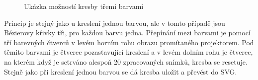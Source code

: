 \documentclass[twoside,12pt]{article}
\begin{document}
\begin{figure}[ht]
 \begin{center}
 \end{center}
 \caption{Ukázka možností kresby třemi barvami}
\end{figure}
Princip je stejný jako u kreslení jednou barvou, ale v tomto případě jsou Bézierovy křivky tři, pro každou barvu jedna. Přepínání mezi barvami je pomocí tří barevných čtverců v levém horním rohu obrazu promítaného projektorem. Pod těmito barvami je čtverec pozastavující kreslení a v levém dolním rohu je čtverec, na kterém když je setrváno alespoň 20 zpracovaných snímků, kresba se resetuje. Stejně jako při kreslení jednou barvou se dá kresba uložit a převést do SVG.
\end{document}
